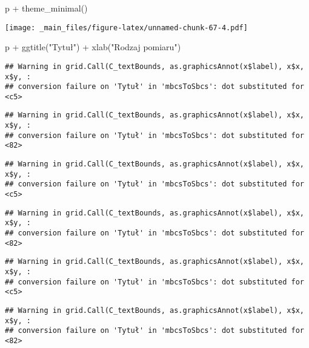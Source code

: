\documentclass[
]{book}
\newenvironment{Shaded}{\begin{snugshade}}{\end{snugshade}}
\newcommand{\FunctionTok}[1]{\textcolor[rgb]{0.00,0.00,0.00}{#1}}
\newcommand{\NormalTok}[1]{#1}
\newcommand{\SpecialCharTok}[1]{\textcolor[rgb]{0.00,0.00,0.00}{#1}}
\newcommand{\StringTok}[1]{\textcolor[rgb]{0.31,0.60,0.02}{#1}}
\begin{document}
\begin{Shaded}
\begin{Highlighting}[]
\NormalTok{p }\SpecialCharTok{+} \FunctionTok{theme\_minimal}\NormalTok{()}
\end{Highlighting}
\end{Shaded}

\texttt{[image: \_main\_files/figure-latex/unnamed-chunk-67-4.pdf]}

\begin{Shaded}
\begin{Highlighting}[]
\NormalTok{p }\SpecialCharTok{+} \FunctionTok{ggtitle}\NormalTok{(}\StringTok{"Tytuł"}\NormalTok{) }\SpecialCharTok{+} \FunctionTok{xlab}\NormalTok{(}\StringTok{"Rodzaj pomiaru"}\NormalTok{)}
\end{Highlighting}
\end{Shaded}

\begin{verbatim}
## Warning in grid.Call(C_textBounds, as.graphicsAnnot(x$label), x$x, x$y, :
## conversion failure on 'Tytuł' in 'mbcsToSbcs': dot substituted for <c5>
\end{verbatim}

\begin{verbatim}
## Warning in grid.Call(C_textBounds, as.graphicsAnnot(x$label), x$x, x$y, :
## conversion failure on 'Tytuł' in 'mbcsToSbcs': dot substituted for <82>
\end{verbatim}

\begin{verbatim}
## Warning in grid.Call(C_textBounds, as.graphicsAnnot(x$label), x$x, x$y, :
## conversion failure on 'Tytuł' in 'mbcsToSbcs': dot substituted for <c5>
\end{verbatim}

\begin{verbatim}
## Warning in grid.Call(C_textBounds, as.graphicsAnnot(x$label), x$x, x$y, :
## conversion failure on 'Tytuł' in 'mbcsToSbcs': dot substituted for <82>
\end{verbatim}

\begin{verbatim}
## Warning in grid.Call(C_textBounds, as.graphicsAnnot(x$label), x$x, x$y, :
## conversion failure on 'Tytuł' in 'mbcsToSbcs': dot substituted for <c5>
\end{verbatim}

\begin{verbatim}
## Warning in grid.Call(C_textBounds, as.graphicsAnnot(x$label), x$x, x$y, :
## conversion failure on 'Tytuł' in 'mbcsToSbcs': dot substituted for <82>
\end{verbatim}
\end{document}
